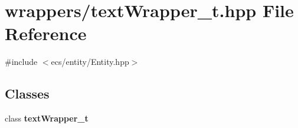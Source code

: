 \section{wrappers/text\+Wrapper\+\_\+t.hpp File Reference}
\label{text_wrapper__t_8hpp}
{\ttfamily \#include $<$ecs/entity/\+Entity.\+hpp$>$}\newline
\subsection*{Classes}
\begin{DoxyCompactItemize}
\item 
class \textbf{ text\+Wrapper\+\_\+t}
\end{DoxyCompactItemize}
